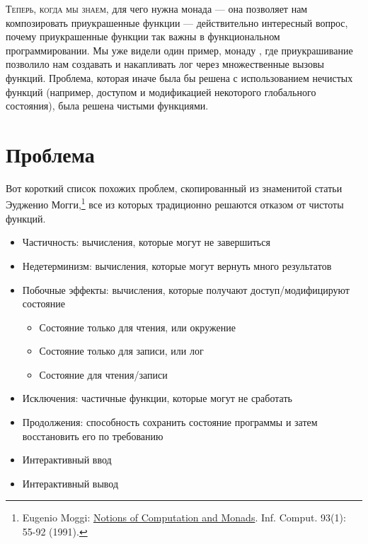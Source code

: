 
\lettrine[lhang=0.17]{Т}{еперь, когда мы знаем}, для чего нужна монада --- она позволяет нам композировать
приукрашенные функции --- действительно интересный вопрос, почему
приукрашенные функции так важны в функциональном программировании. Мы уже
видели один пример, монаду , где приукрашивание
позволило нам создавать и накапливать лог через множественные вызовы функций.
Проблема, которая иначе была бы решена с использованием нечистых функций (например,
доступом и модификацией некоторого глобального состояния), была решена чистыми
функциями.

\section{Проблема}

Вот короткий список похожих проблем, скопированный из
знаменитой статьи Эудженио Могги,\footnote{Eugenio Moggi:
  \href{https://doi.org/10.1016/0890-5401(91)90052-4}{
    Notions of Computation and Monads}. Inf. Comput. 93(1): 55-92 (1991).}
все из которых традиционно решаются отказом от чистоты функций.

\begin{itemize}
  \tightlist
  \item
        Частичность: вычисления, которые могут не завершиться
  \item
        Недетерминизм: вычисления, которые могут вернуть много результатов
  \item
        Побочные эффекты: вычисления, которые получают доступ/модифицируют состояние

        \begin{itemize}
          \tightlist
          \item
                Состояние только для чтения, или окружение
          \item
                Состояние только для записи, или лог
          \item
                Состояние для чтения/записи
        \end{itemize}
  \item
        Исключения: частичные функции, которые могут не сработать
  \item
        Продолжения: способность сохранить состояние программы и затем восстановить
        его по требованию
  \item
        Интерактивный ввод
  \item
        Интерактивный вывод
\end{itemize}

